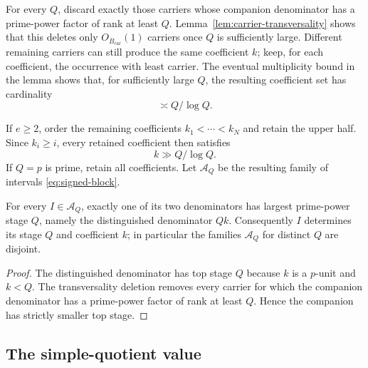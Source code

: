 For every $Q$, discard exactly those carriers whose companion denominator has a prime-power factor of rank at least $Q$.  Lemma~\ref{lem:carrier-transversality} shows that this deletes only $O_{B_{\mathrm{car}}}(1)$ carriers once $Q$ is sufficiently large.  Different remaining carriers can still produce the same coefficient $k$; keep, for each coefficient, the occurrence with least carrier.  The eventual multiplicity bound in the lemma shows that, for sufficiently large $Q$, the resulting coefficient set has cardinality
\[
\asymp Q/\log Q.
\]

If $e\ge2$, order the remaining coefficients $k_1<\cdots<k_N$ and retain the upper half.  Since $k_i\ge i$, every retained coefficient then satisfies
\begin{equation}\label{eq:coef-lower}
k\gg Q/\log Q.
\end{equation}
If $Q=p$ is prime, retain all coefficients.  Let $\mathcal A_Q$ be the resulting family of intervals \eqref{eq:signed-block}.

\begin{lemma}\label{lem:top-stage-recovery}
For every $I\in\mathcal A_Q$, exactly one of its two denominators has largest prime-power stage $Q$, namely the distinguished denominator $Qk$.  Consequently $I$ determines its stage $Q$ and coefficient $k$; in particular the families $\mathcal A_Q$ for distinct $Q$ are disjoint.
\end{lemma}

\begin{proof}
The distinguished denominator has top stage $Q$ because $k$ is a $p$-unit and $k<Q$.  The transversality deletion removes every carrier for which the companion denominator has a prime-power factor of rank at least $Q$.  Hence the companion has strictly smaller top stage.
\end{proof}

\subsection{The simple-quotient value}

